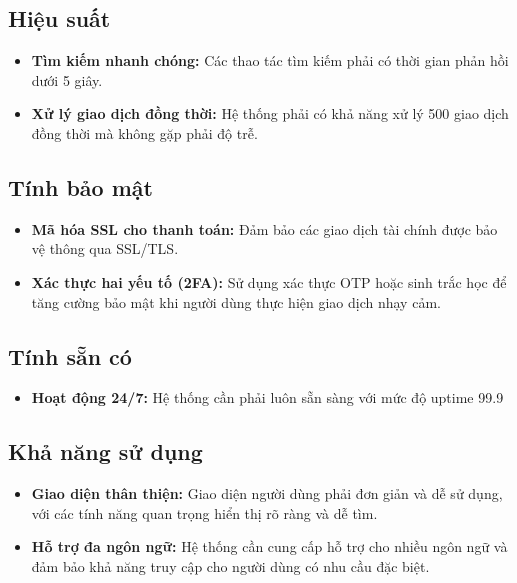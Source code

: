 \subsection{Hiệu suất}
\begin{itemize}
    \item \textbf{Tìm kiếm nhanh chóng:} Các thao tác tìm kiếm phải có thời gian phản hồi dưới 5 giây.
    \item \textbf{Xử lý giao dịch đồng thời:} Hệ thống phải có khả năng xử lý 500 giao dịch đồng thời mà không gặp phải độ trễ.
\end{itemize}

\subsection{Tính bảo mật}
\begin{itemize}
    \item \textbf{Mã hóa SSL cho thanh toán:} Đảm bảo các giao dịch tài chính được bảo vệ thông qua SSL/TLS.
    \item \textbf{Xác thực hai yếu tố (2FA):} Sử dụng xác thực OTP hoặc sinh trắc học để tăng cường bảo mật khi người dùng thực hiện giao dịch nhạy cảm.
\end{itemize}

\subsection{Tính sẵn có}
\begin{itemize}
    \item \textbf{Hoạt động 24/7:} Hệ thống cần phải luôn sẵn sàng với mức độ uptime 99.9%
    
\end{itemize}



\subsection{Khả năng sử dụng}
\begin{itemize}
    \item \textbf{Giao diện thân thiện:} Giao diện người dùng phải đơn giản và dễ sử dụng, với các tính năng quan trọng hiển thị rõ ràng và dễ tìm.
    \item \textbf{Hỗ trợ đa ngôn ngữ:} Hệ thống cần cung cấp hỗ trợ cho nhiều ngôn ngữ và đảm bảo khả năng truy cập cho người dùng có nhu cầu đặc biệt.
\end{itemize}

